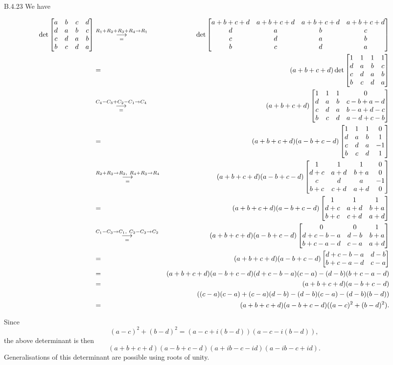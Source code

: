 \begin{Answer}{B.4.23}
 We have

 \begin{eqnarray*}\det \begin{bmatrix} a & b & c & d \cr d & a & b
& c \cr c & d & a & b \cr b & c & d & a\cr         \end{bmatrix} &
\grstep[=]{R_1+R_2+R_3+R_4\to R_1} & \det \begin{bmatrix} a+b+c+d &
a+b+c+d & a+b+c+d & a+b+c+d \cr d & a & b & c \cr c & d & a & b \cr
b & c & d & a\cr
\end{bmatrix}\\
& = & (a+b+c+d)\det \begin{bmatrix} 1 & 1 & 1 & 1 \cr d & a & b & c
\cr c & d & a & b \cr b & c & d & a\cr         \end{bmatrix}\\
& \grstep[=]{C_4-C_3+C_2-C_1\to C_4} & (a+b+c+d)\begin{bmatrix} 1 &
1 & 1 & 0\cr d & a & b & c-b+a-d \cr c & d & a & b-a+d-c \cr b & c &
d & a-d+c-b\cr
\end{bmatrix}\\
& = &  (a+b+c+d)(a-b+c-d)\begin{bmatrix} 1 & 1 & 1 & 0\cr d & a & b
& 1\cr c & d & a & -1 \cr b & c & d & 1\cr
\end{bmatrix}\\
& \grstep[=]{R_2+R_3\to R_2,\ R_4+R_3\to R_4} &
(a+b+c+d)(a-b+c-d)\begin{bmatrix} 1 & 1 & 1 & 0\cr d+c & a+d & b+a &
0\cr c & d & a & -1 \cr b+c & c+d & a+d & 0\cr
\end{bmatrix}\\
&= & (a+b+c+d)(a-b+c-d)\begin{bmatrix} 1 & 1 & 1 \cr d+c & a+d & b+a
\cr  b+c & c+d & a+d \cr
\end{bmatrix}\\
& \grstep[=]{C_1-C_3\to C_1, \ C_2-C_3\to C_2} &
(a+b+c+d)(a-b+c-d)\begin{bmatrix} 0 & 0 & 1 \cr d+c-b-a & d-b & b+a
\cr b+c-a-d & c-a
 & a+d \cr
\end{bmatrix}\\
& = & (a+b+c+d)(a-b+c-d)\begin{bmatrix}  d+c-b-a & d-b \cr b+c-a-d &
c-a
 \cr
\end{bmatrix}\\
& = & (a+b+c+d)(a-b+c-d) (d+c-b-a)(c-a)-(d-b)(b+c-a-d)
\\
& = & (a+b+c+d)(a-b+c-d)\\
& & \qquad
((c-a)(c-a)+(c-a)(d-b)-(d-b)(c-a)-(d-b)(b-d))
\\
& = & (a+b+c+d)(a-b+c-d)((a-c)^2+(b-d)^2).
\end{eqnarray*}
\begin{rem}
Since $$ (a-c)^2+(b-d)^2=(a-c+i(b-d))(a-c-i(b-d)), $$ the
above determinant is then
$$ (a+b+c+d)(a-b+c-d)(a+ib-c-id)(a-ib-c+id). $$
Generalisations of this determinant are possible using roots of
unity.
\end{rem}
\end{Answer}

